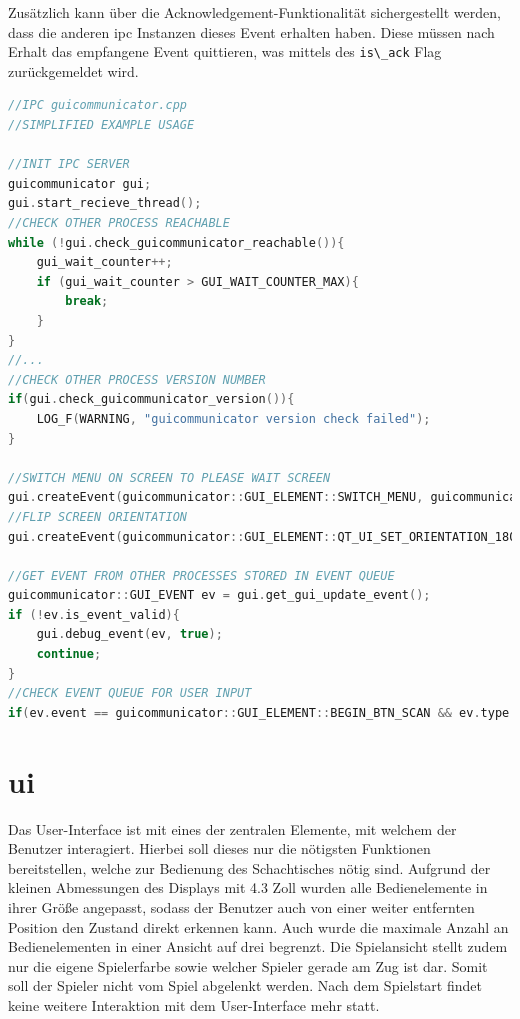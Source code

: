 Zusätzlich kann über die Acknowledgement-Funktionalität sichergestellt
werden, dass die anderen \gls{ipc} Instanzen dieses Event erhalten
haben. Diese müssen nach Erhalt das empfangene Event quittieren, was
mittels des \passthrough{\lstinline!is\_ack!} Flag zurückgemeldet wird.

\begin{lstlisting}[language={C++}]
//IPC guicommunicator.cpp
//SIMPLIFIED EXAMPLE USAGE

//INIT IPC SERVER
guicommunicator gui;
gui.start_recieve_thread();
//CHECK OTHER PROCESS REACHABLE
while (!gui.check_guicommunicator_reachable()){
    gui_wait_counter++;
    if (gui_wait_counter > GUI_WAIT_COUNTER_MAX){
        break;
    }
}
//...
//CHECK OTHER PROCESS VERSION NUMBER
if(gui.check_guicommunicator_version()){
    LOG_F(WARNING, "guicommunicator version check failed");
}

//SWITCH MENU ON SCREEN TO PLEASE WAIT SCREEN
gui.createEvent(guicommunicator::GUI_ELEMENT::SWITCH_MENU, guicommunicator::GUI_VALUE_TYPE::PROCESSING_SCREEN);
//FLIP SCREEN ORIENTATION
gui.createEvent(guicommunicator::GUI_ELEMENT::QT_UI_SET_ORIENTATION_180, guicommunicator::GUI_VALUE_TYPE::ENABLED);

//GET EVENT FROM OTHER PROCESSES STORED IN EVENT QUEUE
guicommunicator::GUI_EVENT ev = gui.get_gui_update_event();
if (!ev.is_event_valid){
    gui.debug_event(ev, true);
    continue;
}
//CHECK EVENT QUEUE FOR USER INPUT
if(ev.event == guicommunicator::GUI_ELEMENT::BEGIN_BTN_SCAN && ev.type == guicommunicator::GUI_VALUE_TYPE::CLICKED) {}
\end{lstlisting}

\hypertarget{ui}{%
\section{\texorpdfstring{\gls{ui}}{}}\label{ui}}

Das User-Interface ist mit eines der zentralen Elemente, mit welchem der
Benutzer interagiert. Hierbei soll dieses nur die nötigsten Funktionen
bereitstellen, welche zur Bedienung des Schachtisches nötig sind.
Aufgrund der kleinen Abmessungen des Displays mit 4.3 Zoll wurden alle
Bedienelemente in ihrer Größe angepasst, sodass der Benutzer auch von
einer weiter entfernten Position den Zustand direkt erkennen kann. Auch
wurde die maximale Anzahl an Bedienelementen in einer Ansicht auf drei
begrenzt. Die Spielansicht stellt zudem nur die eigene Spielerfarbe
sowie welcher Spieler gerade am Zug ist dar. Somit soll der Spieler
nicht vom Spiel abgelenkt werden. Nach dem Spielstart findet keine
weitere Interaktion mit dem User-Interface mehr statt.

